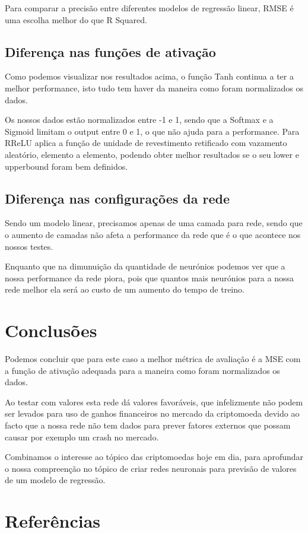 \documentclass[10pt]{article}
\begin{document}
Para comparar a precisão entre diferentes modelos de 
regressão linear, RMSE é uma escolha melhor do que R Squared.

\subsection{Diferença nas funções de ativação}

Como podemos visualizar nos resultados acima, o função Tanh continua
a ter a melhor performance, isto tudo tem haver da maneira como foram
normalizados os dados.

Os nossos dados estão normalizados entre -1 e 1, sendo que a Softmax e a Sigmoid
limitam o output entre 0 e 1, o que não ajuda para a performance.
Para RReLU aplica a função de unidade de revestimento 
retificado com vazamento aleatório, elemento a elemento,
podendo obter melhor resultados se o seu lower e upperbound
foram bem definidos.

\subsection{Diferença nas configurações da rede}

Sendo um modelo linear, precisamos apenas de uma camada para
rede, sendo que o aumento de camadas não afeta a performance da rede
que é o que acontece nos nossos testes.

Enquanto que na dimunuição da quantidade de neurónios podemos ver 
que a nossa performance da rede piora, pois que quantos mais neurónios
para a nossa rede melhor ela será ao custo de um aumento do tempo
de treino.

\vspace{3cm}
\section{Conclusões}\label{sec:an-da-info-fin-da-org}
Podemos concluir que para este caso a melhor métrica de avaliação
é a MSE com a função de ativação adequada para a maneira como foram
normalizados os dados.

Ao testar com valores esta rede dá valores favoráveis, que infelizmente
não podem ser levados para uso de ganhos financeiros no mercado
da criptomoeda devido ao facto que a nossa rede não tem dados
para prever fatores externos que possam causar por exemplo
um crash no mercado.

Combinamos o interesse ao tópico das criptomoedas hoje em dia, 
para aprofundar o nossa compreenção no tópico de criar redes 
neuronais para previsão de valores de um modelo de regressão.


\vspace{1cm}

\section{Referências}\label{sec:sup-inf-utl}


\nocite{Binance_2021}



\pagebreak
\end{document}
